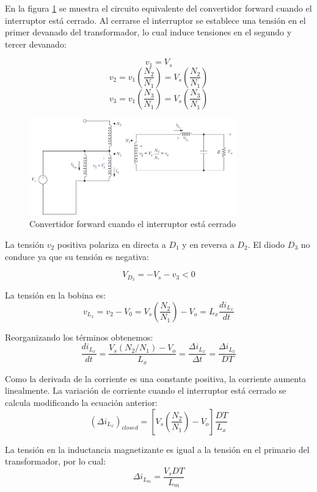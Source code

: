 En la figura \ref{fig:forward_switch_closed} se muestra el circuito equivalente del convertidor forward cuando el interruptor
está cerrado. Al cerrarse el interruptor se establece una tensión en el primer devanado del transformador,
lo cual induce tensiones en el segundo y tercer devanado:

$$ v_1=V_s $$
$$ v_2=v_1\left(\frac{N_2}{N_1}\right)=V_s\left(\frac{N_2}{N_1}\right) $$
$$ v_3=v_1\left(\frac{N_3}{N_1}\right)=V_s\left(\frac{N_3}{N_1}\right) $$

\begin{figure}[ht]
    \centering
    \includegraphics[width=0.8\textwidth]{../images/hart/forward_switch_closed.png}
    \caption{Convertidor forward cuando el interruptor está cerrado}
    \label{fig:forward_switch_closed}
\end{figure}

La tensión $v_2$ positiva polariza en directa a $D_1$ y en reversa a $D_2$. El diodo $D_3$ no conduce ya que su tensión es negativa:

$$ V_{D_3}=-V_s-v_3<0 $$

La tensión en la bobina es:
$$ v_{L_x}=v_2-V_0=V_s\left(\frac{N_2}{N_1}\right)-V_o=L_x\frac{di_{L_x}}{dt} $$

Reorganizando los términos obtenemos:
$$ \frac{di_{L_x}}{dt}=\frac{V_s(N_2/N_1)-V_o}{L_x}=\frac{\Delta i_{L_x}}{\Delta t}=\frac{\Delta i_{L_x}}{DT} $$

Como la derivada de la corriente es una constante positiva, la corriente aumenta linealmente. 
La variación de corriente cuando el interruptor está cerrado se calcula modificando la ecuación anterior:
$$ (\Delta i_{L_x})_{closed}=\left[V_s\left(\frac{N_2}{N_1}\right)-V_o\right]\frac{DT}{L_x} $$

La tensión en la inductancia magnetizante es igual a la tensión en el primario del transformador, por lo cual:
$$ \Delta i_{L_m}=\frac{V_sDT}{L_m} $$

